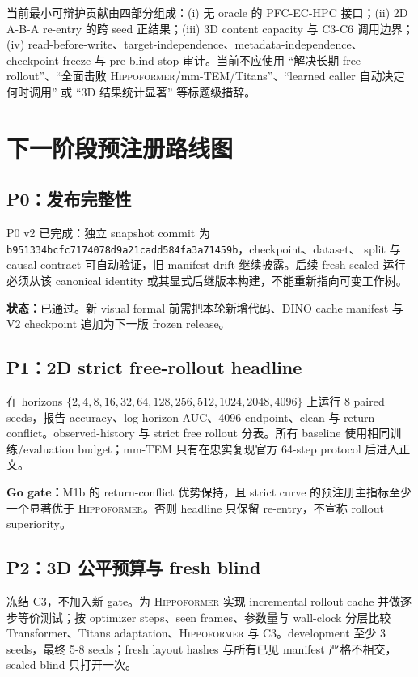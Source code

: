 \documentclass{article}
\newcommand{\base}{\textsc{Hippoformer}}
\newcommand{\good}[1]{\textcolor{memorygreen}{#1}}
\begin{document}
当前最小可辩护贡献由四部分组成：(i) 无 oracle 的 PFC-EC-HPC 接口；(ii) 2D A-B-A re-entry 的跨 seed 正结果；(iii) 3D content capacity 与 C3-C6 调用边界；(iv) read-before-write、target-independence、metadata-independence、checkpoint-freeze 与 pre-blind stop 审计。当前不应使用 ``解决长期 free rollout''、``全面击败 \base{}/mm-TEM/Titans''、``learned caller 自动决定何时调用'' 或 ``3D 结果统计显著'' 等标题级措辞。

\section{下一阶段预注册路线图}

\subsection{P0：发布完整性}

P0 v2 已完成：独立 snapshot commit 为
\texttt{b951334bcfc7174078d9a21cadd584fa3a71459b}，checkpoint、dataset、
split 与 causal contract 可自动验证，旧 manifest drift 继续披露。后续 fresh
sealed 运行必须从该 canonical identity 或其显式后继版本构建，不能重新指向可变工作树。

\textbf{状态：}\good{已通过。}新 visual formal 前需把本轮新增代码、DINO cache
manifest 与 V2 checkpoint 追加为下一版 frozen release。

\subsection{P1：2D strict free-rollout headline}

在 horizons $\{2,4,8,16,32,64,128,256,512,1024,2048,4096\}$ 上运行 8 paired seeds，报告 accuracy、log-horizon AUC、4096 endpoint、clean 与 return-conflict。observed-history 与 strict free rollout 分表。所有 baseline 使用相同训练/evaluation budget；mm-TEM 只有在忠实复现官方 64-step protocol 后进入正文。

\textbf{Go gate：}M1b 的 return-conflict 优势保持，且 strict curve 的预注册主指标至少一个显著优于 \base{}。否则 headline 只保留 re-entry，不宣称 rollout superiority。

\subsection{P2：3D 公平预算与 fresh blind}

冻结 C3，不加入新 gate。为 \base{} 实现 incremental rollout cache 并做逐步等价测试；按 optimizer steps、seen frames、参数量与 wall-clock 分层比较 Transformer、Titans adaptation、\base{} 与 C3。development 至少 3 seeds，最终 5-8 seeds；fresh layout hashes 与所有已见 manifest 严格不相交，sealed blind 只打开一次。
\end{document}
